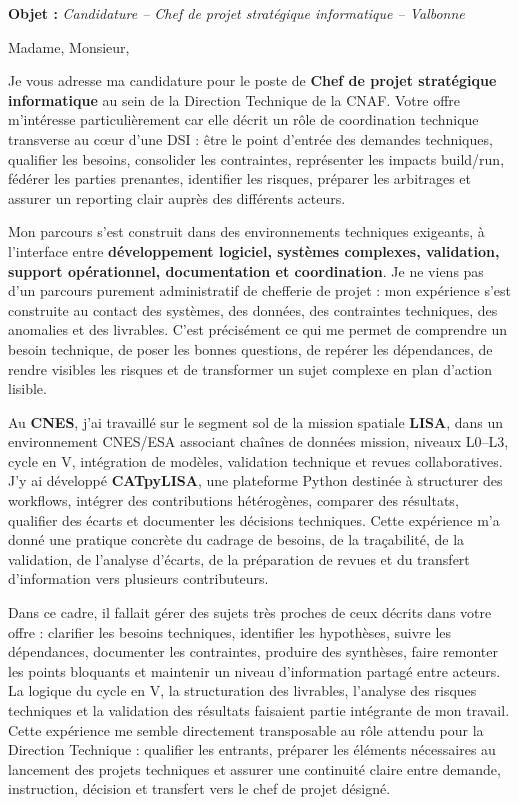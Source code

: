 \documentclass[11pt,a4paper]{altacv}
\begin{document}
\makecvheader
\vspace{-0.65cm}

\vspace{-0.45cm}

{\color{accent}\textbf{Objet :}} \textit{Candidature -- Chef de projet stratégique informatique -- Valbonne}

{\color{body}

Madame, Monsieur,

Je vous adresse ma candidature pour le poste de \textbf{Chef de projet stratégique informatique} au sein de la Direction Technique de la CNAF. Votre offre m'intéresse particulièrement car elle décrit un rôle de coordination technique transverse au cœur d'une DSI : être le point d'entrée des demandes techniques, qualifier les besoins, consolider les contraintes, représenter les impacts build/run, fédérer les parties prenantes, identifier les risques, préparer les arbitrages et assurer un reporting clair auprès des différents acteurs.

Mon parcours s'est construit dans des environnements techniques exigeants, à l'interface entre \textbf{développement logiciel, systèmes complexes, validation, support opérationnel, documentation et coordination}. Je ne viens pas d'un parcours purement administratif de chefferie de projet : mon expérience s'est construite au contact des systèmes, des données, des contraintes techniques, des anomalies et des livrables. C'est précisément ce qui me permet de comprendre un besoin technique, de poser les bonnes questions, de repérer les dépendances, de rendre visibles les risques et de transformer un sujet complexe en plan d'action lisible.

Au \textbf{CNES}, j'ai travaillé sur le segment sol de la mission spatiale \textbf{LISA}, dans un environnement CNES/ESA associant chaînes de données mission, niveaux L0--L3, cycle en V, intégration de modèles, validation technique et revues collaboratives. J'y ai développé \textbf{CATpyLISA}, une plateforme Python destinée à structurer des workflows, intégrer des contributions hétérogènes, comparer des résultats, qualifier des écarts et documenter les décisions techniques. Cette expérience m'a donné une pratique concrète du cadrage de besoins, de la traçabilité, de la validation, de l'analyse d'écarts, de la préparation de revues et du transfert d'information vers plusieurs contributeurs.

Dans ce cadre, il fallait gérer des sujets très proches de ceux décrits dans votre offre : clarifier les besoins techniques, identifier les hypothèses, suivre les dépendances, documenter les contraintes, produire des synthèses, faire remonter les points bloquants et maintenir un niveau d'information partagé entre acteurs. La logique du cycle en V, la structuration des livrables, l'analyse des risques techniques et la validation des résultats faisaient partie intégrante de mon travail. Cette expérience me semble directement transposable au rôle attendu pour la Direction Technique : qualifier les entrants, préparer les éléments nécessaires au lancement des projets techniques et assurer une continuité claire entre demande, instruction, décision et transfert vers le chef de projet désigné.

}
\end{document}
